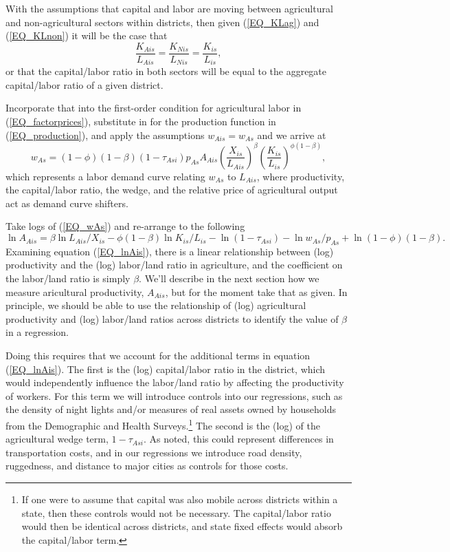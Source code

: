 \documentclass[12pt]{article}
\begin{document}
With the assumptions that capital and labor are moving between agricultural and non-agricultural sectors within districts, then given (\ref{EQ_KLag}) and (\ref{EQ_KLnon}) it will be the case that
\begin{equation*}
	\frac{K_{Ais}}{L_{Ais}} = \frac{K_{Nis}}{L_{Nis}} = \frac{K_{is}}{L_{is}},
\end{equation*}
or that the capital/labor ratio in both sectors will be equal to the aggregate capital/labor ratio of a given district.

Incorporate that into the first-order condition for agricultural labor in (\ref{EQ_factorprices}), substitute in for the production function in (\ref{EQ_production}), and apply the assumptions $w_{Ais} = w_{As}$ and we arrive at
\begin{equation}
	w_{As} = (1-\phi)(1-\beta) (1-\tau_{Asi}) p_{As} A_{Ais} \left(\frac{X_{is}}{L_{Ais}}\right)^{\beta} \left(\frac{K_{is}}{L_{is}}\right)^{\phi(1-\beta)}, \label{EQ_wAs}
\end{equation}
which represents a labor demand curve relating $w_{As}$ to $L_{Ais}$, where productivity, the capital/labor ratio, the wedge, and the relative price of agricultural output act as demand curve shifters. 

Take logs of (\ref{EQ_wAs}) and re-arrange to the following
\begin{equation}
	\ln A_{Ais} = \beta \ln L_{Ais}/X_{is} - \phi(1-\beta) \ln K_{is}/L_{is} - \ln (1-\tau_{Asi}) - \ln w_{As}/p_{As} + \ln (1-\phi)(1-\beta). \label{EQ_lnAis}
\end{equation}
Examining equation (\ref{EQ_lnAis}), there is a linear relationship between (log) productivity and the (log) labor/land ratio in agriculture, and the coefficient on the labor/land ratio is simply $\beta$. We'll describe in the next section how we measure aricultural productivity, $A_{Ais}$, but for the moment take that as given. In principle, we should be able to use the relationship of (log) agricultural productivity and (log) labor/land ratios across districts to identify the value of $\beta$ in a regression.

Doing this requires that we account for the additional terms in equation (\ref{EQ_lnAis}). The first is the (log) capital/labor ratio in the district, which would independently influence the labor/land ratio by affecting the productivity of workers. For this term we will introduce controls into our regressions, such as the density of night lights and/or measures of real assets owned by households from the Demographic and Health Surveys.\footnote{If one were to assume that capital was also mobile across districts within a state, then these controls would not be necessary. The capital/labor ratio would then be identical across districts, and state fixed effects would absorb the capital/labor term.} The second is the (log) of the agricultural wedge term, $1-\tau_{Asi}$. As noted, this could represent differences in transportation costs, and in our regressions we introduce road density, ruggedness, and distance to major cities as controls for those costs.
\end{document}
